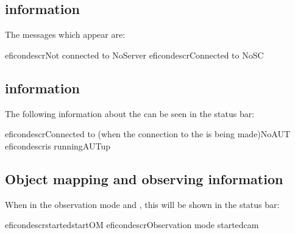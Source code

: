 
\subsection{\gdagent information}

The \gdagent messages which appear are:

\begin{gdreficon}
  \app{}eficondescr{Not connected to \gdagent}{NoServer}
  \app{}eficondescr{Connected to \gdagent}{NoSC}
\end{gdreficon}


\subsection{\gdaut information}

The following information about the \gdaut can be seen in the status bar:

\begin{gdreficon}
  \app{}eficondescr{Connected to \gdagent (when the connection to the \gdaut is being made)}{NoAUT}
  \app{}eficondescr{\gdaut is running}{AUTup}
\end{gdreficon}


\subsection{Object mapping and observing information}

When in the observation mode and \gdomm{}, this will be shown in the status bar:

\begin{gdreficon}
  \app{}eficondescr{\gdomm started}{startOM}
  \app{}eficondescr{Observation mode started}{cam}
\end{gdreficon}


